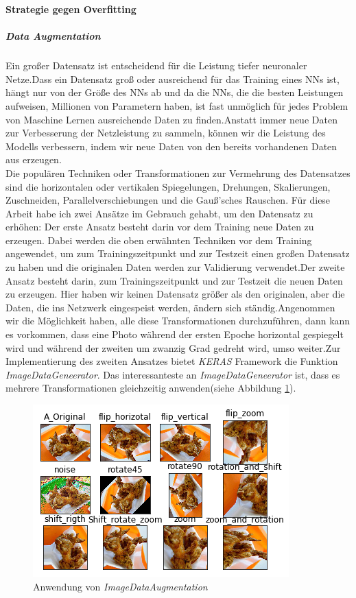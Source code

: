 \documentclass[12pt,a4paper]{scrartcl}
\numberwithin{equation}{section}
\begin{document}
\begin{center}
	\textbf{Strategie gegen Overfitting}
\end{center}
\subparagraph{{Data Augmentation}}\label{Data Augmentation}
Ein großer Datensatz ist entscheidend für die Leistung tiefer neuronaler Netze.Dass ein Datensatz groß oder ausreichend für das Training eines \ac{NN}s ist, hängt nur von der Größe des \ac{NN}s ab und da die \acsp{NN}, die die besten Leistungen aufweisen, Millionen von Parametern haben, ist fast unmöglich für jedes  Problem von Maschine Lernen ausreichende Daten zu finden.Anstatt immer neue Daten zur Verbesserung der Netzleistung zu sammeln, können wir die Leistung des Modells verbessern, indem wir neue Daten von den bereits vorhandenen Daten aus erzeugen.\\
Die populären Techniken oder Transformationen zur Vermehrung des Datensatzes sind die horizontalen oder vertikalen Spiegelungen, Drehungen, Skalierungen, Zuschneiden, Parallelverschiebungen und die Gauß'sches Rauschen.
Für diese Arbeit habe ich zwei Ansätze im Gebrauch gehabt, um den Datensatz zu erhöhen:
Der erste Ansatz besteht darin vor dem Training neue Daten zu erzeugen. Dabei werden die oben erwähnten Techniken vor dem Training angewendet, um zum Trainingszeitpunkt und zur Testzeit einen großen Datensatz zu haben und die originalen Daten werden zur Validierung verwendet.Der zweite Ansatz besteht darin, zum Trainingszeitpunkt und zur Testzeit die neuen Daten zu erzeugen. Hier haben wir keinen Datensatz größer als den originalen, aber die Daten, die ins Netzwerk eingespeist werden, ändern sich ständig.Angenommen wir die Möglichkeit haben, alle diese Transformationen durchzuführen, dann kann es vorkommen, dass eine Photo während der ersten Epoche horizontal gespiegelt wird und während der zweiten um  zwanzig Grad gedreht wird, umso weiter.Zur Implementierung des zweiten Ansatzes bietet \textit{KERAS} Framework die Funktion \textit{ImageDataGeneerator}. Das interessanteste an \textit{ImageDataGeneerator} ist, dass es mehrere Transformationen gleichzeitig anwenden(siehe Abbildung \ref{fig:ImageDataAugmentation}).

\begin{figure}[h]
	\centering
	\includegraphics{ImageDataAugmaentation.png}
	\caption{Anwendung von \textit{ImageDataAugmentation} }
	\label{fig:ImageDataAugmentation}
\end{figure}
\end{document}
